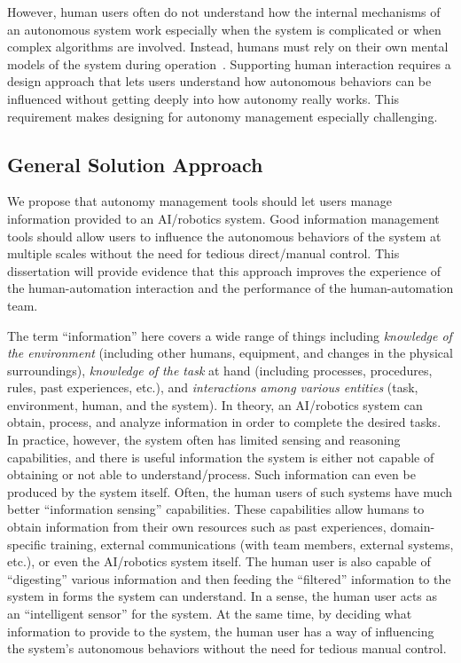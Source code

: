 However, human users often do not understand how the internal mechanisms of an autonomous system work especially when the system is complicated or when complex algorithms are involved. Instead, humans must rely on their own mental models of the system during operation~\cite{Moray1999Mental}. Supporting human interaction requires a design approach that lets users understand how autonomous behaviors can be influenced without getting deeply into how autonomy really works. This requirement makes designing for autonomy management especially challenging.

\subsection{General Solution Approach}

We propose that autonomy management tools should let users manage information provided to an AI/robotics system. Good information management tools should allow users to influence the autonomous behaviors of the system at multiple scales without the need for tedious direct/manual control. This dissertation will provide evidence that this approach improves the experience of the human-automation interaction and the performance of the human-automation team.

The term ``information'' here covers a wide range of things including \textit{knowledge of the environment} (including other humans, equipment, and changes in the physical surroundings), \textit{knowledge of the task} at hand (including processes, procedures, rules, past experiences, etc.), and \textit{interactions among various entities} (task, environment, human, and the system). In theory, an AI/robotics system can obtain, process, and analyze information in order to complete the desired tasks. In practice, however, the system often has limited sensing and reasoning capabilities, and there is useful information the system is either not capable of obtaining or not able to understand/process. Such information can even be produced by the system itself. Often, the human users of such systems have much better ``information sensing'' capabilities. These capabilities allow humans to obtain information from their own resources such as past experiences, domain-specific training, external communications (with team members, external systems, etc.), or even the AI/robotics system itself. The human user is also capable of ``digesting'' various information and then feeding the ``filtered'' information to the system in forms the system can understand. In a sense, the human user acts as an ``intelligent sensor'' for the system. At the same time, by deciding what information to provide to the system, the human user has a way of influencing the system's autonomous behaviors without the need for tedious manual control.

